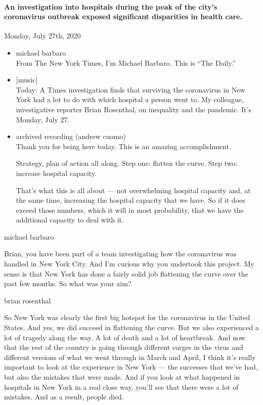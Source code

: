 \hypertarget{an-investigation-into-hospitals-during-the-peak-of-the-citys-coronavirus-outbreak-exposed-significant-disparities-in-health-care}{%
\paragraph{An investigation into hospitals during the peak of the city's
coronavirus outbreak exposed significant disparities in health
care.}\label{an-investigation-into-hospitals-during-the-peak-of-the-citys-coronavirus-outbreak-exposed-significant-disparities-in-health-care}}

Monday, July 27th, 2020

\begin{itemize}
\item
  michael barbaro\\
  From The New York Times, I'm Michael Barbaro. This is ``The Daily.''
\item
  {[}music{]}\\
  Today: A Times investigation finds that surviving the coronavirus in
  New York had a lot to do with which hospital a person went to. My
  colleague, investigative reporter Brian Rosenthal, on inequality and
  the pandemic. It's Monday, July 27.
\item
  archived recording (andrew cuomo)\\
  Thank you for being here today. This is an amazing accomplishment.

  Strategy, plan of action all along. Step one: flatten the curve. Step
  two: increase hospital capacity.

  That's what this is all about --- not overwhelming hospital capacity
  and, at the same time, increasing the hospital capacity that we have.
  So if it does exceed those numbers, which it will in most probability,
  that we have the additional capacity to deal with it.
\end{itemize}

michael barbaro

Brian, you have been part of a team investigating how the coronavirus
was handled in New York City. And I'm curious why you undertook this
project. My sense is that New York has done a fairly solid job
flattening the curve over the past few months. So what was your aim?

brian rosenthal

So New York was clearly the first big hotspot for the coronavirus in the
United States. And yes, we did succeed in flattening the curve. But we
also experienced a lot of tragedy along the way. A lot of death and a
lot of heartbreak. And now that the rest of the country is going through
different surges in the virus and different versions of what we went
through in March and April, I think it's really important to look at the
experience in New York --- the successes that we've had, but also the
mistakes that were made. And if you look at what happened in hospitals
in New York in a real close way, you'll see that there were a lot of
mistakes. And as a result, people died.

